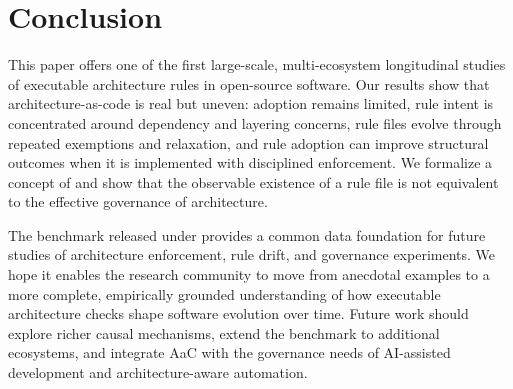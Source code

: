\section{Conclusion}\label{sec:conclusion}

This paper offers one of the first large-scale, multi-ecosystem longitudinal studies of executable architecture rules in open-source software. Our results show that architecture-as-code is real but uneven: adoption remains limited, rule intent is concentrated around dependency and layering concerns, rule files evolve through repeated exemptions and relaxation, and rule adoption can improve structural outcomes when it is implemented with disciplined enforcement. We formalize a concept of \rrot and show that the observable existence of a rule file is not equivalent to the effective governance of architecture.

The benchmark released under \ArchRules provides a common data foundation for future studies of architecture enforcement, rule drift, and governance experiments. We hope it enables the research community to move from anecdotal examples to a more complete, empirically grounded understanding of how executable architecture checks shape software evolution over time. Future work should explore richer causal mechanisms, extend the benchmark to additional ecosystems, and integrate AaC with the governance needs of AI-assisted development and architecture-aware automation.

